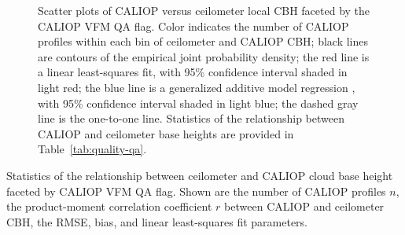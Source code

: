 \documentclass[essd,manuscript]{copernicus}\usepackage[]{graphicx}\usepackage[]{color}
\makeatletter
\newenvironment{kframe}{%
 \def\at@end@of@kframe{}%
 \ifinner\ifhmode%
  \def\at@end@of@kframe{\end{minipage}}%
  \begin{minipage}{\columnwidth}%
 \fi\fi%
 \def\FrameCommand##1{\hskip\@totalleftmargin \hskip-\fboxsep
 \colorbox{shadecolor}{##1}\hskip-\fboxsep
     \hskip-\linewidth \hskip-\@totalleftmargin \hskip\columnwidth}%
 \MakeFramed {\advance\hsize-\width
   \@totalleftmargin\z@ \linewidth\hsize
   \@setminipage}}%
 {\par\unskip\endMakeFramed%
 \at@end@of@kframe}
\makeatother
\begin{document}
\begin{figure}
  \centering
  \caption{Scatter plots of CALIOP versus ceilometer local CBH
    faceted by the CALIOP VFM QA flag.  Color indicates the number of CALIOP
    profiles within each bin of ceilometer and CALIOP CBH; black
    lines are contours of the empirical joint probability density; the red line
    is a linear least-squares fit, with 95\% confidence interval shaded in light
    red; the blue line is a generalized additive model regression
    \citep{Wood2004,Wood2011}, with 95\% confidence interval shaded in light
    blue; the dashed gray line is the one-to-one line.  Statistics of the
    relationship between CALIOP and ceilometer base heights are provided in
    Table~\ref{tab:quality-qa}.}
  \label{fig:quality-qa}
\end{figure}

\begin{table}
  \centering
  \caption{Statistics of the relationship between ceilometer and CALIOP cloud
    base height faceted by CALIOP VFM QA flag.  Shown are the number of CALIOP
    profiles $n$, the product-moment correlation coefficient $r$ between CALIOP
    and ceilometer CBH, the RMSE, bias, and linear least-squares
    fit parameters.}
  \label{tab:quality-qa}
\begin{kframe}


{\ttfamily\noindent\bfseries\color{errorcolor}{\#\# Error in select\_impl(.data, vars): invalid column index : NA for variable: 'group1' = 'group1'}}\end{kframe}
\end{table}
\end{document}
